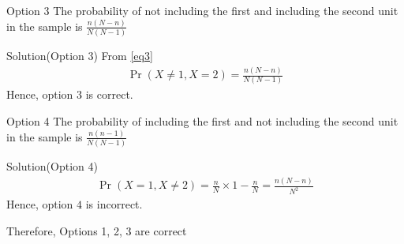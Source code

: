 \documentclass{beamer}
\providecommand{\pr}[1]{\ensuremath{\Pr\left(#1\right)}}
\begin{document}
\begin{frame}{Option 3}
    The probability of not including the first and including the second unit in the sample is              $\frac{n(N-n)}{N(N-1)}$
\end{frame}
\begin{frame}{Solution(Option 3)}
From \eqref{eq3}
    \begin{align}
        \pr{X\neq1,X=2} = \frac{n (N-n)}{N (N-1)}
    \end{align}
    Hence, option $3$ is correct.
\end{frame}
\begin{frame}{Option 4}
    The probability of including the first and not including the second unit in the sample is              $\frac{n(n-1)}{N(N-1)}$
\end{frame}
\begin{frame}{Solution(Option 4)}
    \begin{align}
       \pr{X=1, X\neq2} = \frac{n}{N} \times 1-\frac{n}{N} = \frac{n(N-n)}{N^2}
    \end{align}
    Hence, option $4$ is incorrect.

Therefore, Options 1, 2, 3 are correct
\end{frame}
\end{document}
